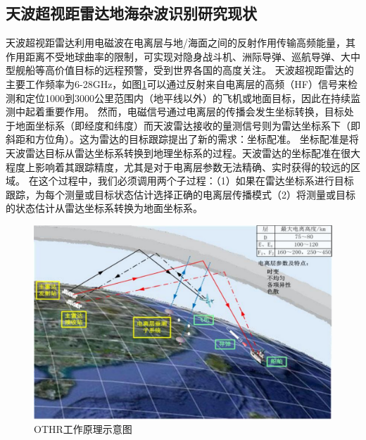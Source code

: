 \subsection{天波超视距雷达地海杂波识别研究现状}
天波超视距雷达利用电磁波在电离层与地/海面之间的反射作用传输高频能量，其作用距离不受地球曲率的限制，可实现对隐身战斗机、洲际导弹、巡航导弹、大中型舰船等高价值目标的远程预警，受到世界各国的高度关注。
天波超视距雷达的主要工作频率为6-28GHz，如图\ref{fig:othr_how}可以通过反射来自电离层的高频（HF）信号来检测和定位1000到3000公里范围内（地平线以外）的飞机或地面目标，因此在持续监测中起着重要作用\cite{headrick1974over, fabrizio2013high}。
然而，电磁信号通过电离层的传播会发生坐标转换，目标处于地面坐标系（即经度和纬度）而天波雷达接收的量测信号则为雷达坐标系下（即斜距和方位角）\cite{krolik1997maximum}。这为雷达的目标跟踪提出了新的需求：坐标配准。
坐标配准是将天波雷达目标从雷达坐标系转换到地理坐标系的过程。天波雷达的坐标配准在很大程度上影响着其跟踪精度，尤其是对于电离层参数无法精确、实时获得的较远的区域。
在这个过程中，我们必须调用两个子过程：（1）如果在雷达坐标系进行目标跟踪，为每个测量或目标状态估计选择正确的电离层传播模式（2）将测量或目标的状态估计从雷达坐标系转换为地面坐标系。
\begin{figure}[htb]
	\centering
	\includegraphics[width=\textwidth]{figures/othr/othr_how}
	\caption{OTHR工作原理示意图}
	\label{fig:othr_how}
\end{figure}

